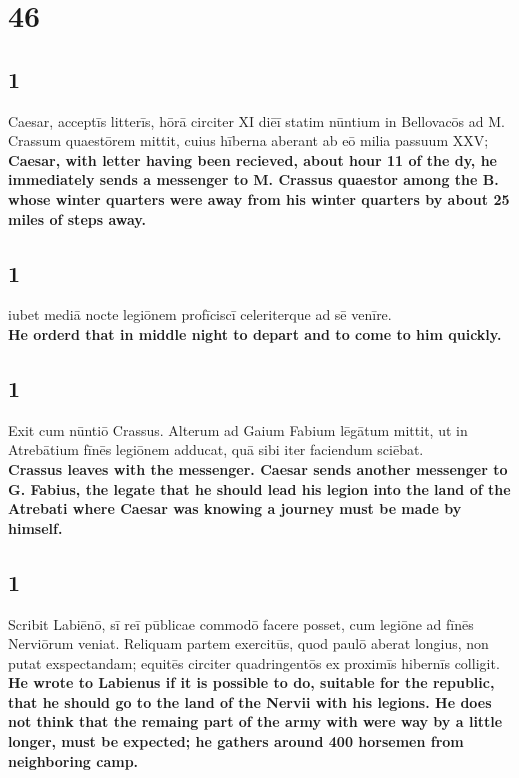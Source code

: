 \documentclass{article}
\begin{document}
\section*{46}

\subsection*{1}
Caesar, acceptīs litterīs, hōrā circiter XI diēī statim nūntium in Bellovacōs ad M. Crassum quaestōrem mittit, cuius hīberna aberant ab eō milia passuum XXV;\\
\textbf{Caesar, with letter having been recieved, about hour 11 of the dy, he immediately sends a messenger to M. Crassus quaestor among the B. whose winter quarters were away from his winter quarters by about 25 miles of steps away.}

\subsection*{1}
iubet mediā nocte legiōnem profīciscī celeriterque ad sē venīre.\\
\textbf{He orderd that in middle night to depart and to come to him quickly.}

\subsection*{1}
Exit cum nūntiō Crassus. Alterum ad Gaium Fabium lēgātum mittit, ut in Atrebātium fīnēs legiōnem adducat, quā sibi iter faciendum sciēbat. \\
\textbf{Crassus leaves with the messenger. Caesar sends another messenger to G. Fabius, the legate that he should lead his legion into the land of the Atrebati where Caesar was knowing a journey must be made by himself.}

\subsection*{1}
Scribit Labiēnō, sī reī pūblicae commodō facere posset, cum legiōne ad fīnēs Nerviōrum veniat. Reliquam partem exercitūs, quod paulō aberat longius, non putat exspectandam; equitēs circiter quadringentōs ex proximīs hibernīs colligit.\\
\textbf{He wrote to Labienus if it is possible to do, suitable for the republic, that he should go to the land of the Nervii with his legions. He does not think that the remaing part of the army with were way by a little longer, must be expected; he gathers around 400 horsemen from neighboring camp.}
\end{document}

